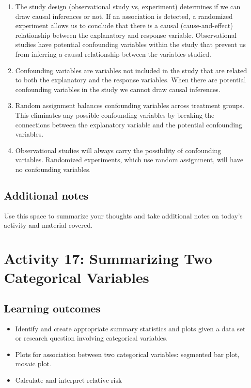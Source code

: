\documentclass[
]{report}
\begin{document}
\begin{enumerate}
\def\labelenumi{\arabic{enumi}.}
\item
  The study design (observational study vs, experiment) determines if we can draw causal inferences or not. If an association is detected, a randomized experiment allows us to conclude that there is a causal (cause-and-effect) relationship between the explanatory and response variable. Observational studies have potential confounding variables within the study that prevent us from inferring a causal relationship between the variables studied.
\item
  Confounding variables are variables not included in the study that are related to both the explanatory and the response variables. When there are potential confounding variables in the study we cannot draw causal inferences.
\item
  Random assignment balances confounding variables across treatment groups. This eliminates any possible confounding variables by breaking the connections between the explanatory variable and the potential confounding variables.
\item
  Observational studies will always carry the possibility of confounding variables. Randomized experiments, which use random assignment, will have no confounding variables.
\end{enumerate}

\subsection{Additional notes}\label{additional-notes}

Use this space to summarize your thoughts and take additional notes on today's activity and material covered.

\newpage

\section{Activity 17: Summarizing Two Categorical Variables}\label{activity-17-summarizing-two-categorical-variables}


\subsection{Learning outcomes}\label{learning-outcomes-1}

\begin{itemize}
\item
  Identify and create appropriate summary statistics and plots given a data set or research question involving categorical variables.
\item
  Plots for association between two categorical variables:
  segmented bar plot, mosaic plot.
\item
  Calculate and interpret relative risk
\end{itemize}
\end{document}
